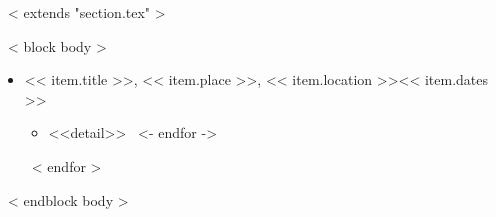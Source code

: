 ~< extends "section.tex" >~

~< block body >~
  \begin{itemize}
    ~< for item in items >~
      \item << item.title >>, << item.place >>, << item.location >>\hfill << item.dates >>
        \begin{itemize}
          ~< for detail in item.details ->~
            \item <<detail>>
          ~<- endfor ->~
        \end{itemize}
    ~< endfor >~
  \end{itemize}
~< endblock body >~
